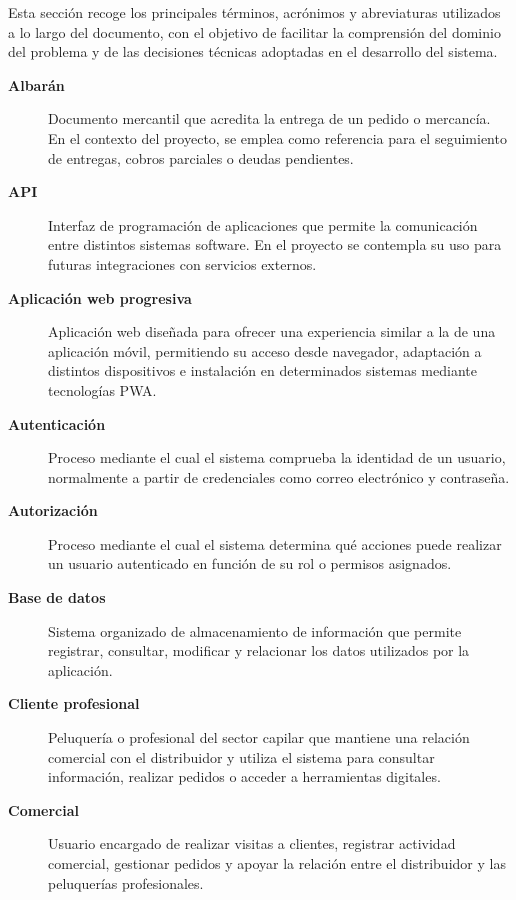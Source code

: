 Esta sección recoge los principales términos, acrónimos y abreviaturas utilizados a lo largo del documento, con el objetivo de facilitar la comprensión del dominio del problema y de las decisiones técnicas adoptadas en el desarrollo del sistema.

\begin{description}

\item[\textbf{Albarán}]
Documento mercantil que acredita la entrega de un pedido o mercancía. En el contexto del proyecto, se emplea como referencia para el seguimiento de entregas, cobros parciales o deudas pendientes.

\item[\textbf{API}]
Interfaz de programación de aplicaciones que permite la comunicación entre distintos sistemas software. En el proyecto se contempla su uso para futuras integraciones con servicios externos.

\item[\textbf{Aplicación web progresiva}]
Aplicación web diseñada para ofrecer una experiencia similar a la de una aplicación móvil, permitiendo su acceso desde navegador, adaptación a distintos dispositivos e instalación en determinados sistemas mediante tecnologías PWA.

\item[\textbf{Autenticación}]
Proceso mediante el cual el sistema comprueba la identidad de un usuario, normalmente a partir de credenciales como correo electrónico y contraseña.

\item[\textbf{Autorización}]
Proceso mediante el cual el sistema determina qué acciones puede realizar un usuario autenticado en función de su rol o permisos asignados.

\item[\textbf{Base de datos}]
Sistema organizado de almacenamiento de información que permite registrar, consultar, modificar y relacionar los datos utilizados por la aplicación.

\item[\textbf{Cliente profesional}]
Peluquería o profesional del sector capilar que mantiene una relación comercial con el distribuidor y utiliza el sistema para consultar información, realizar pedidos o acceder a herramientas digitales.

\item[\textbf{Comercial}]
Usuario encargado de realizar visitas a clientes, registrar actividad comercial, gestionar pedidos y apoyar la relación entre el distribuidor y las peluquerías profesionales.


\end{description}
